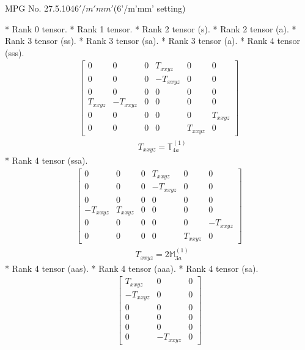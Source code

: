 \documentclass[fleqn,8pt,landscape]{jsarticle}
\begin{document}
\setcounter{MaxMatrixCols}{32}

\renewcommand{\tablename}{Table~}
\renewcommand{\figurename}{Figure~}
\begin{center}
\LARGE
MPG No. 27.5.104\quad$6'/m'mm'$\quad(6'/m'mm' setting)
\end{center}
* Rank 0 tensor.
* Rank 1 tensor.
* Rank 2 tensor (s).
* Rank 2 tensor (a).
* Rank 3 tensor (ss).
* Rank 3 tensor (sa).
* Rank 3 tensor (a).
* Rank 4 tensor (sss).
\begin{align*}
\begin{bmatrix} 0 & 0 & 0 & T_{xxyz} & 0 & 0 \\ 0 & 0 & 0 & - T_{xxyz} & 0 & 0 \\ 0 & 0 & 0 & 0 & 0 & 0 \\ T_{xxyz} & - T_{xxyz} & 0 & 0 & 0 & 0 \\ 0 & 0 & 0 & 0 & 0 & T_{xxyz} \\ 0 & 0 & 0 & 0 & T_{xxyz} & 0 \end{bmatrix}
\end{align*}
\begin{align*}
& T_{xxyz} = \mathbb{T}_{4a}^{(1)}
\end{align*}
* Rank 4 tensor (ssa).
\begin{align*}
\begin{bmatrix} 0 & 0 & 0 & T_{xxyz} & 0 & 0 \\ 0 & 0 & 0 & - T_{xxyz} & 0 & 0 \\ 0 & 0 & 0 & 0 & 0 & 0 \\ - T_{xxyz} & T_{xxyz} & 0 & 0 & 0 & 0 \\ 0 & 0 & 0 & 0 & 0 & - T_{xxyz} \\ 0 & 0 & 0 & 0 & T_{xxyz} & 0 \end{bmatrix}
\end{align*}
\begin{align*}
& T_{xxyz} = 2 \mathbb{M}_{3a}^{(1)}
\end{align*}
* Rank 4 tensor (aas).
* Rank 4 tensor (aaa).
* Rank 4 tensor (sa).
\begin{align*}
\begin{bmatrix} T_{xxyz} & 0 & 0 \\ - T_{xxyz} & 0 & 0 \\ 0 & 0 & 0 \\ 0 & 0 & 0 \\ 0 & 0 & 0 \\ 0 & - T_{xxyz} & 0 \end{bmatrix}
\end{align*}
\end{document}
